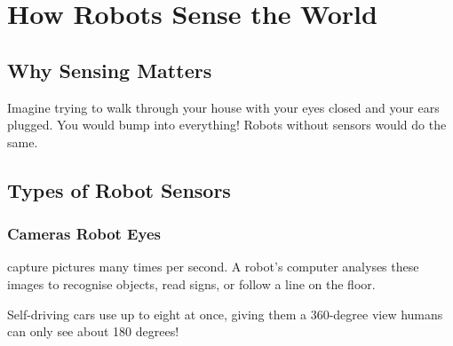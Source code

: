 
\chapter{How Robots Sense the World}


\section*{Why Sensing Matters}

Imagine trying to walk through your house with your eyes closed and your
ears plugged. You would bump into everything! Robots without sensors would
do the same.


\sectionrule

\section*{Types of Robot Sensors}

\subsection*{Cameras \textemdash{} Robot Eyes}

 capture pictures many times per second. A robot's computer analyses
these images to recognise objects, read signs, or follow a line on the floor.

\begin{funfact}
  Self-driving cars use up to eight  at once, giving them a
  360-degree view \textemdash{} humans can only see about 180 degrees!
\end{funfact}


